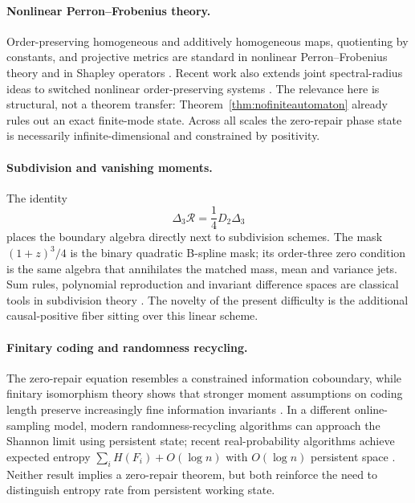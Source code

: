 \documentclass[11pt,a4paper]{article}
\theoremstyle{definition}
\theoremstyle{remark}
\newcommand{\cR}{\mathcal R}
\begin{document}
\paragraph{Nonlinear Perron--Frobenius theory.}
Order-preserving homogeneous and additively homogeneous maps, quotienting by
constants, and projective metrics are standard in nonlinear
Perron--Frobenius theory and in Shapley operators
\cite{LemmensNussbaum2012,Lins2023,AkianGaubertHochart2020}.  Recent work also
extends joint spectral-radius ideas to switched nonlinear order-preserving
systems \cite{DeiddaGuglielmiTudisco2025}.  The relevance here is structural,
not a theorem transfer: Theorem~\ref{thm:nofiniteautomaton} already rules out
an exact finite-mode state.  Across all scales the zero-repair phase state is
necessarily infinite-dimensional and constrained by positivity.

\paragraph{Subdivision and vanishing moments.}
The identity
\[
 \Delta_3\cR=\frac14D_2\Delta_3
\]
places the boundary algebra directly next to subdivision schemes.  The mask
$(1+z)^3/4$ is the binary quadratic B-spline mask; its order-three zero
condition is the same algebra that annihilates the matched mass, mean and
variance jets.  Sum rules, polynomial reproduction and invariant difference
spaces are classical tools in subdivision theory \cite{CharinaConti2013}.
The novelty of the present difficulty is the additional causal-positive fiber
sitting over this linear scheme.

\paragraph{Finitary coding and randomness recycling.}
The zero-repair equation resembles a constrained information coboundary, while
finitary isomorphism theory shows that stronger moment assumptions on coding
length preserve increasingly fine information invariants
\cite{Parry1979,Schmidt1984,HarveyPeres2011}.  In a different online-sampling
model, modern randomness-recycling algorithms can approach the Shannon limit
using persistent state; recent real-probability algorithms achieve expected
entropy $\sum_iH(F_i)+O(\log n)$ with $O(\log n)$ persistent space
\cite{DraperSaad2026,DraperHarrisSaad2026}.  Neither result implies a
zero-repair theorem, but both reinforce the need to distinguish entropy rate
from persistent working state.
\end{document}

